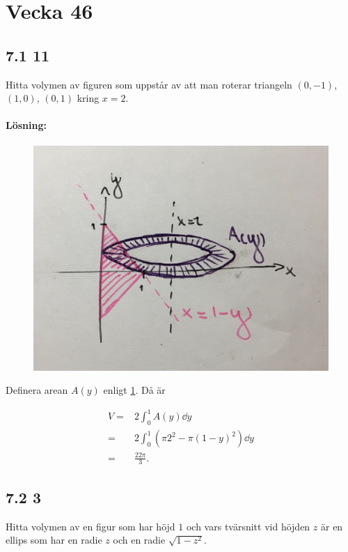 \section{Vecka 46}%
\label{sec:vecka_46}

\subsection{7.1 11}%
\label{sub:7_1_11}

Hitta volymen av figuren som uppstår av att man roterar triangeln $(0, -1)$, $(1, 0)$, $(0, 1)$ kring $x = 2$.

\paragraph{Lösning:}

\begin{figure}[ht]
	\centering
	\includegraphics[width=0.6\linewidth]{figures/rotationsvolym_7_1_11.jpg}
	\caption{}%
	\label{fig:figures/rotationsvolym_7_1_11}
\end{figure}

Definera arean $A(y)$ enligt \cref{fig:figures/rotationsvolym_7_1_11}.
Då är

\begin{align*}
	V ={}& 2 \int_0^1 A(y) \dd{y}\\
	={}& 2 \int_0^1 \left(\pi 2^2 - \pi (1 - y)^2\right) \dd{y}\\
	={}& \frac{22 \pi}{3}.
\end{align*}


\subsection{7.2 3}%
\label{sub:7_2_3}

Hitta volymen av en figur som har höjd $1$ och vars tvärsnitt vid höjden $z$ är en ellips som har en radie $z$ och en radie $\sqrt{1 - z^2}$.

